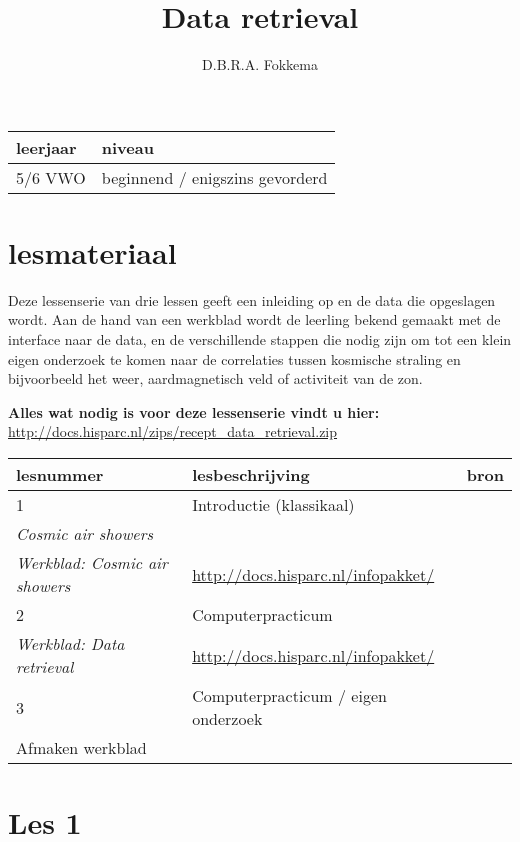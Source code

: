 

\title{Data retrieval}
\author{D.B.R.A. Fokkema}



\maketitle

\begin{tabular}{|>{\raggedright}p{2.5cm}|>{\raggedright}p{12.5cm}|}
\hline
leerjaar & niveau \tabularnewline
\hline
5/6 VWO & beginnend / enigszins gevorderd\tabularnewline
\hline
\end{tabular}


\section{lesmateriaal}

Deze lessenserie van drie lessen geeft een inleiding op \hisparc en de
data die opgeslagen wordt. Aan de hand van een werkblad wordt de leerling
bekend gemaakt met de interface naar de \hisparc data, en de verschillende
stappen die nodig zijn om tot een klein eigen onderzoek te komen naar de
correlaties tussen kosmische straling en bijvoorbeeld het weer,
aardmagnetisch veld of activiteit van de zon.

\textbf{Alles wat nodig is voor deze lessenserie vindt u hier:}
\url{http://docs.hisparc.nl/zips/recept_data_retrieval.zip}

\begin{tabular}{ |>{\raggedright}p{2.5cm}|>{\raggedright}p{8cm}|>{\raggedright}p{4cm}|}
\hline
lesnummer & lesbeschrijving & bron \tabularnewline
\hline
1 & Introductie (klassikaal) \\
\emph{Cosmic air showers} \\
\emph{Werkblad: Cosmic air showers}
& \url{http://docs.hisparc.nl/infopakket/} \tabularnewline
\hline
2 & Computerpracticum \\
\emph{Werkblad: Data retrieval}
& \url{http://docs.hisparc.nl/infopakket/} \tabularnewline
\hline
3 & Computerpracticum / eigen onderzoek \\
Afmaken werkblad
& \tabularnewline
\hline
\end{tabular}


\section{Les 1}

